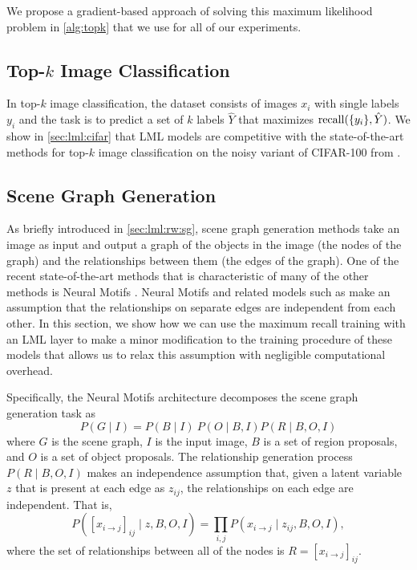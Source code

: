 We propose a gradient-based approach of solving this maximum
likelihood problem in \cref{alg:topk} that we use for
all of our experiments.

\subsection{Top-$k$ Image Classification}
\label{sec:lml:topk:image}

In top-$k$ image classification, the dataset consists
of images $x_i$ with single labels $y_i$ and the task
is to predict a set of $k$ labels $\hat Y$ that
maximizes ${\rm recall}(\{y_i\}, \hat Y)$.
We show in \cref{sec:lml:cifar} that LML models are competitive with
the state-of-the-art methods
for top-$k$ image classification on the noisy variant of
\mbox{CIFAR-100} from \citet{berrada2018smooth}.

\subsection{Scene Graph Generation}
\label{sec:lml:topk:sg}

As briefly introduced in \cref{sec:lml:rw:sg}, scene graph generation
methods take an image as input and output a graph of the objects
in the image (the nodes of the graph) and the relationships
between them (the edges of the graph).
One of the recent state-of-the-art methods that
is characteristic of many of the other methods is
Neural Motifs \citep{zellers2018neural}.
Neural Motifs and related models such as
\citet{xu2017scene}
make an assumption that
the relationships on separate edges are independent from
each other.
In this section, we show how we can use the maximum recall training
with an LML layer to make a minor modification
to the training procedure of these models that allows us
to relax this assumption with negligible computational overhead.

Specifically, the Neural Motifs architecture decomposes the scene
graph generation task as
\begin{equation*}
P(G \mid I) = P(B \mid I) \ P(O \mid B, I) P(R \mid B, O, I)
\end{equation*}
where $G$ is the scene graph, $I$ is the input image,
$B$ is a set of region proposals,
and $O$ is a set of object proposals.
The relationship generation process $P(R\mid B, O, I)$
makes an independence assumption that,
given a latent variable $z$ that is present at
each edge as $z_{ij}$,
the relationships on each edge are independent.
That is,
$$P([x_{i\to j}]_{ij}\mid z, B,O, I)=\prod_{i,j} P(x_{i\to j}\mid z_{ij},B,O,I),$$
where the set of relationships between
all of the nodes is $R=[x_{i\to j}]_{ij}$.

